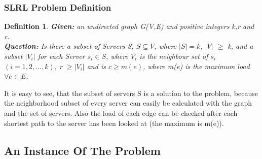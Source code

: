 \documentclass [12pt]{article}
\newtheorem{mydef}{Definition}
\begin{document}
\subsubsection{SLRL Problem Definition}

\begin{mydef}
  {\itshape \textbf{Given:} an undirected graph G(V,E) and  positive integers k,r and c.\\
    \textbf{Question:} 
    Is there a subset of Servers S, $S \subseteq V$, where $|S| = k$, $|V|$ $\geq$ k,
    and a subset $|V_i|$ for each Server $s_i \in S$, where $V_i$ is the neighbour set of $s_i$ $(i=1,2,\dots,k)$, r $\geq  |V_i|$ 
    and is $c \geq m(e)$, where m(e) is the maximum load $\forall e \in E$.} 

\end{mydef}

It is easy to see, that the subset of servers S is a solution to the problem, because the neighborhood subset
of every server can easily be calculated with the graph and the set of servers. Also the load of each edge
can be checked after each shortest path to the server has been looked at (the maximum is m(e)).

\subsection{An Instance Of The Problem}
\indent
\indent
\indent
\end{document}
